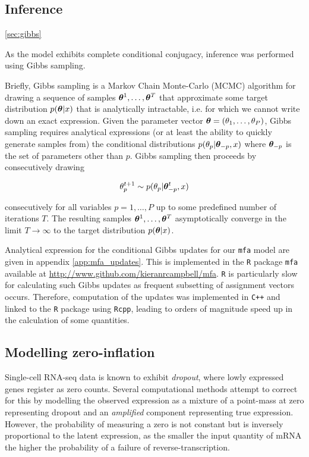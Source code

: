 \subsection{Inference} \ref{sec:gibbs}

As the model exhibits complete conditional conjugacy, inference was performed using Gibbs sampling.

Briefly, Gibbs sampling is a Markov Chain Monte-Carlo (MCMC) algorithm for drawing a sequence of samples ${\bm \theta}^1, \ldots, \bm \theta^T$ that approximate some target distribution $p({\bm \theta} | x)$ that is analytically intractable, i.e. for which we cannot write down an exact expression. Given the parameter vector ${\bm \theta} = (\theta_1, \ldots, \theta_P)$, Gibbs sampling requires analytical expressions (or at least the ability to quickly generate samples from) the conditional distributions $p(\theta_p | {\bm \theta}_{-p}, x)$ where ${\bm \theta}_{-p}$ is the set of parameters other than $p$. Gibbs sampling then proceeds by consecutively drawing

\begin{equation}
		\theta_p^{t+1}  \sim p(\theta_p | {\bm \theta}^t_{-p}, x)
\end{equation}

consecutively for all variables $p = 1, \ldots, P$ up to some predefined number of iterations $T$. The resulting samples ${\bm \theta}^1, \ldots, \bm \theta^T$ asymptotically converge in the limit $T \rightarrow \infty$ to the target distribution $p({\bm \theta} | x)$.

Analytical expression for the conditional Gibbs updates for our \texttt{mfa} model are given in appendix \ref{app:mfa_updates}. This is implemented in the \texttt{R} package \texttt{mfa} available at \url{http://www.github.com/kieranrcampbell/mfa}. \texttt{R} is particularly slow for calculating such Gibbs updates as frequent subsetting of assignment vectors occurs. Therefore, computation of the updates was implemented in \texttt{C++} and linked to the \texttt{R} package using \texttt{Rcpp}, leading to orders of magnitude speed up in the calculation of some quantities.

\subsection{Modelling zero-inflation}

Single-cell RNA-seq data is known to exhibit \emph{dropout}, where lowly expressed genes register as zero counts. Several computational methods attempt to correct for this by modelling the observed expression as a mixture of a point-mass at zero representing dropout and an \emph{amplified} component representing true expression. However, the probability of measuring a zero is not constant but is inversely proportional to the latent expression, as the smaller the input quantity of mRNA the higher the probability of a failure of reverse-transcription.

